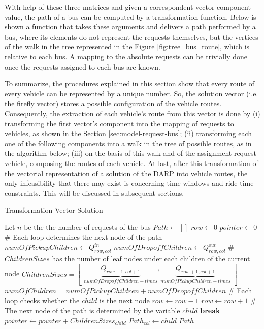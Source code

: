 \documentclass[tuberlin,cic,tc,openright,english,noabntcite,oneside]{iiufrgs}
\begin{document}
With help of these three matrices and given a correspondent vector component value, the path of a bus can be computed by a transformation function. Below is shown a function that takes these arguments and delivers a path performed by a bus, where its elements do not represent the requests themselves, but the vertices of the walk in the tree represented in the Figure \ref{fig:tree_bus_route}, which is relative to each bus. A mapping to the absolute requests can be trivially done once the requests assigned to each bus are known.

To summarize, the procedures explained in this section show that every route of every vehicle can be represented by a unique number. So, the solution vector (i.e. the firefly vector) stores a possible configuration of the vehicle routes. Consequently, the extraction of each vehicle's route from this vector is done by (i) transforming the first vector's component into the mapping of requests to vehicles, as shown in the Section \ref{sec:model-request-bus}; (ii) transforming each one of the following components into a walk in the tree of possible routes, as in the algorithm below; (iii) on the basis of this walk and of the assignment request-vehicle, composing the routes of each vehicle. At last, after this transformation of the vectorial representation of a solution of the DARP into vehicle routes, the only infeasibility that there may exist is concerning time windows and ride time constraints. This will be discussed in subsequent sections.
\begin{algorithm}[H]
\caption{Transformation Vector-Solution}
\begin{algorithmic}
\State Let $n$ be the the number of requests of the bus
\State $Path \gets [ ]$
\State $row \gets 0$
\State $pointer \gets 0$
	\State \# Each loop determines the next node of the path
	\State $\mathit{numOfPickupChildren} \gets Q^{in}_{row,col}$
	\State $\mathit{numOfDropoffChildren} \gets Q^{out}_{row,col}$
	\State \# $ChildrenSizes$ has the number of leaf nodes under each children of the current node
	\State $\displaystyle ChildrenSizes = \begin{bmatrix}\underbrace{Q_{row-1,col+1}}_{\mathit{numOfDropoffChildren}-times}
			, \underbrace{Q_{row+1,col+1}}_{\mathit{numOfPickupChildren}-times}\end{bmatrix}$
	\State $\mathit{numOfChildren} = \mathit{numOfPickupChildren} + \mathit{numOfDropoffChildren}$
		\State \# Each loop checks whether the $child$ is the next node
				\State $row \gets row - 1$
			\Else
				\State $row \gets row + 1$
			\EndIf
			\State \# The next node of the path is determined by the variable $child$
			\State \textbf{break}
		\Else
			\State $pointer \gets pointer + ChildrenSizes_{child}$
		\EndIf
	\EndFor
	\State $Path_{col} \gets child$
\EndFor
\State \Return $Path$
\EndFunction
\end{algorithmic}
\end{algorithm}
\end{document}

